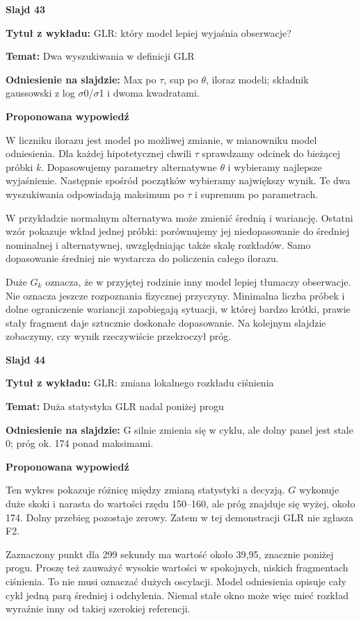 \documentclass[a4paper,11pt]{article}
\newcommand{\NumerSlajdu}{1}
\newcommand{\Komentarz}[3]{%
  \gdef\NumerSlajdu{#1}%
  {\Large\bfseries Slajd #1\par}\smallskip
  \textbf{Tytuł z wykładu:} #2\par
  \textbf{Temat:} #3\par\medskip
}
\begin{document}
\Komentarz{43}{GLR: który model lepiej wyjaśnia obserwacje?}{Dwa wyszukiwania w definicji GLR}
{\small\color{black!65}\textbf{Odniesienie na slajdzie:} Max po \ensuremath{\tau}, sup po \ensuremath{\theta}, iloraz modeli; składnik gaussowski z log \ensuremath{\sigma}0/\ensuremath{\sigma}1 i dwoma kwadratami.\par}
\medskip
\textbf{Proponowana wypowiedź}\par
W liczniku ilorazu jest model po możliwej zmianie, w mianowniku model odniesienia. Dla każdej hipotetycznej chwili $\tau$ sprawdzamy odcinek do bieżącej próbki $k$. Dopasowujemy parametry alternatywne $\theta$ i wybieramy najlepsze wyjaśnienie. Następnie spośród początków wybieramy największy wynik. Te dwa wyszukiwania odpowiadają maksimum po $\tau$ i supremum po parametrach.

W przykładzie normalnym alternatywa może zmienić średnią i wariancję. Ostatni wzór pokazuje wkład jednej próbki: porównujemy jej niedopasowanie do średniej nominalnej i alternatywnej, uwzględniając także skalę rozkładów. Samo dopasowanie średniej nie wystarcza do policzenia całego ilorazu.

Duże $G_k$ oznacza, że w przyjętej rodzinie inny model lepiej tłumaczy obserwacje. Nie oznacza jeszcze rozpoznania fizycznej przyczyny. Minimalna liczba próbek i dolne ograniczenie wariancji zapobiegają sytuacji, w której bardzo krótki, prawie stały fragment daje sztucznie doskonałe dopasowanie. Na kolejnym slajdzie zobaczymy, czy wynik rzeczywiście przekroczył próg.
\clearpage

\Komentarz{44}{GLR: zmiana lokalnego rozkładu ciśnienia}{Duża statystyka GLR nadal poniżej progu}
{\small\color{black!65}\textbf{Odniesienie na slajdzie:} G silnie zmienia się w cyklu, ale dolny panel jest stale 0; próg ok. 174 ponad maksimami.\par}
\medskip
\textbf{Proponowana wypowiedź}\par
Ten wykres pokazuje różnicę między zmianą statystyki a decyzją. $G$ wykonuje duże skoki i narasta do wartości rzędu 150–160, ale próg znajduje się wyżej, około 174. Dolny przebieg pozostaje zerowy. Zatem w tej demonstracji GLR nie zgłasza F2.

Zaznaczony punkt dla 299 sekundy ma wartość około 39,95, znacznie poniżej progu. Proszę też zauważyć wysokie wartości w spokojnych, niskich fragmentach ciśnienia. To nie musi oznaczać dużych oscylacji. Model odniesienia opisuje cały cykl jedną parą średniej i odchylenia. Niemal stałe okno może więc mieć rozkład wyraźnie inny od takiej szerokiej referencji.
\end{document}
